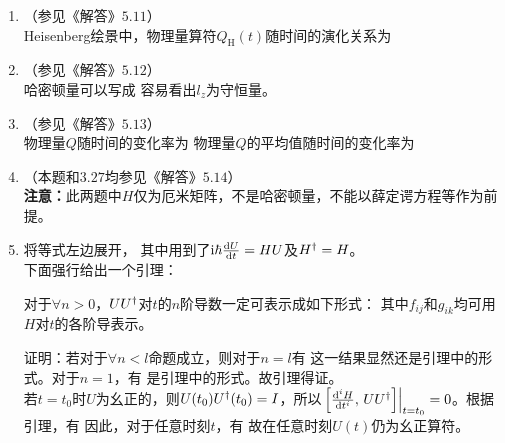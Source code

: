 \begin{enumerate}[label=\textbf{3.\arabic*}, leftmargin=-0.5mm]
\item
（参见《解答》$5.11$）\\
Heisenberg绘景中，物理量算符$Q_\mathrm{H}(t)$随时间的演化关系为

\item
（参见《解答》$5.12$）\\
哈密顿量可以写成
容易看出$l_z$为守恒量。

\item
（参见《解答》$5.13$）\\
物理量$Q$随时间的变化率为
物理量$Q$的平均值随时间的变化率为

\item
（本题和$3.27$均参见《解答》$5.14$）\\
\textbf{注意：}此两题中$H$仅为厄米矩阵，不是哈密顿量，不能以薛定谔方程等作为前提。

\item
将等式左边展开，
其中用到了$\mathrm{i}\hbar\frac{\mathrm{d}U}{\mathrm{d}t}=HU$及$H^\dagger=H$。\\
下面强行给出一个引理：
\begin{lemma}
对于$\forall n>0$，$UU^\dagger$对$t$的$n$阶导数一定可表示成如下形式：
其中$f_{ij}$和$g_{ik}$均可用$H$对$t$的各阶导表示。
\end{lemma}
证明：若对于$\forall n<l$命题成立，则对于$n=l$有
这一结果显然还是引理中的形式。对于$n=1$，有
是引理中的形式。故引理得证。\\
若$t=t_0$时$U$为幺正的，则$U(t_0)U^\dagger(t_0)=I$，所以$\left.\left[\frac{\mathrm{d}^iH}{\mathrm{d}t^i},\,UU^\dagger\right]\right|_{t=t_0}=0$。根据引理，有
因此，对于任意时刻$t$，有
故在任意时刻$U(t)$仍为幺正算符。


\end{enumerate}
